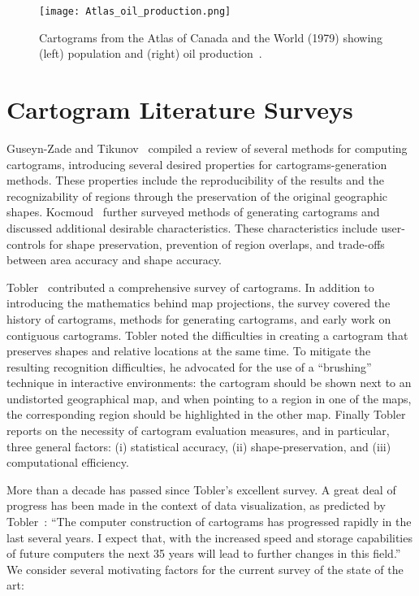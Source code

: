\documentclass{egpubl}
\begin{document}
\begin{figure*}[t]
\begin{center}
\texttt{[image: Atlas\_oil\_production.png]}\\
\caption{Cartograms from the Atlas of Canada and the World (1979) showing (left) population and (right) oil production~\cite{school_cartography}.}
\label{fig:oil_production}
\end{center}
\end{figure*}




\section{Cartogram Literature Surveys}
Guseyn-Zade and Tikunov~\cite{guseyn1994numerical} compiled a review of several methods for computing cartograms, introducing several desired properties for cartograms-generation methods.  These properties include the reproducibility of the results and the recognizability of regions through the preservation of the original geographic shapes. Kocmoud~\cite{kocmoud1997constructing} further surveyed methods of generating cartograms and discussed additional desirable characteristics.
These characteristics include user-controls for shape preservation, prevention of region overlaps, and trade-offs between area accuracy and shape accuracy.




Tobler~\cite{Tobler04} contributed a comprehensive survey of cartograms. In addition to introducing the mathematics behind map projections, the survey covered the history of cartograms, methods for generating cartograms, and early work on contiguous cartograms.
Tobler noted the difficulties in creating a cartogram that preserves shapes and relative locations at the same time. To mitigate the resulting recognition difficulties, he advocated for the use of a ``brushing'' technique in interactive environments: the cartogram should be shown next to an undistorted geographical map, and when pointing to a region in one of the maps, the corresponding region should be highlighted in the other map.
Finally Tobler reports on the necessity of cartogram evaluation measures, and in particular, three general factors: (i) statistical accuracy, (ii) shape-preservation, and (iii) computational efficiency. 

More than a decade has passed since Tobler's excellent survey. A great deal of progress has been made in the context of data visualization, as predicted by Tobler~\cite{Tobler04}: ``The computer construction of cartograms has progressed rapidly in the last several years. I expect that, with the increased speed and storage capabilities of future computers the next 35 years will lead to further changes in this field.''
We consider several motivating factors for the current survey of the state of the art:
\end{document}
